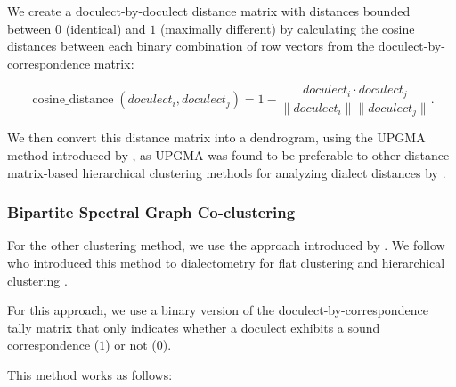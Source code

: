 \documentclass[a4paper]{article}
\begin{document}
We create a doculect-by-doculect distance matrix
with distances bounded between $0$ (identical) and $1$ (maximally different)
by calculating the cosine distances between each
binary combination of row vectors from the doculect-by-correspondence matrix:

\begin{equation*}
\operatorname{cosine\_distance}(doculect_i,doculect_j) =
1 -
\frac{doculect_i \cdot doculect_j}{\lVert doculect_i \rVert \lVert doculect_j \rVert}
.
\end{equation*}

We then convert this distance matrix into a dendrogram,
using the UPGMA method introduced by \citet{sokal1958statistical},
as UPGMA was found to be preferable to other
distance matrix-based hierarchical clustering methods
for analyzing dialect distances by \citet{heeringa2004measuring}.


\subsubsection{Bipartite Spectral Graph Co-clustering}
\label{subsubsec:bsgc}

For the other clustering method, we use the approach
introduced by \citet{dhillon2001co-clustering}.
We follow \citeauthor*{wieling2009bipartite} who introduced
this method to dialectometry for flat clustering \citeyearpar{wieling2009bipartite} and hierarchical clustering \citeyearpar{wieling2010hierarchical}.

For this approach, we use a binary version of the
doculect-by-correspondence tally matrix that only
indicates whether a doculect exhibits
a sound correspondence ($1$) or not ($0$).

This method works as follows:
\end{document}
